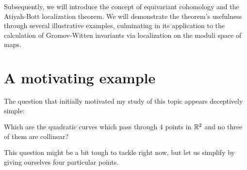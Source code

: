 \documentclass[12pt]{memoir}
\begin{document}
Subsequently, we will introduce the concept of equivariant cohomology and the Atiyah-Bott localization theorem. We will demonstrate the theorem's usefulness through several illustrative examples, culminating in its application to the calculation of Gromov-Witten invariants via localization on the moduli space of maps.

\section{A motivating example}

The question that initially motivated my study of this topic appears deceptively simple:

\begin{significant}
        Which are the quadratic curves which pass through $4$ points in $\mathbb{R}^2$ and no three of them are collinear?
\end{significant}
    This question might be a bit tough to tackle right now, but let us simplify by giving ourselves four particular points.
    
\end{document}
